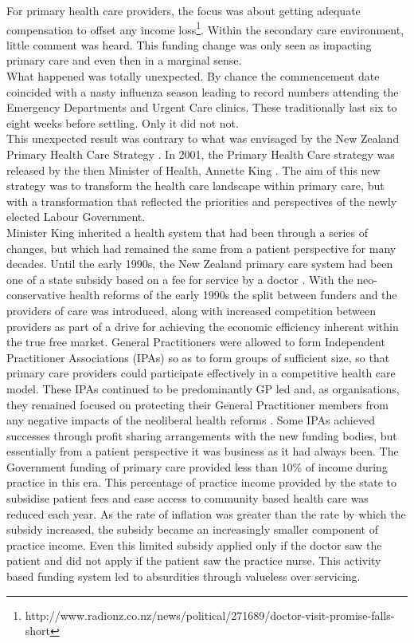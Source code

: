 \documentclass[11pt,a4paper]{article}
\begin{document}
For primary health care providers, the focus was about getting adequate compensation to offset any income loss\footnote{http://www.radionz.co.nz/news/political/271689/doctor-visit-promise-falls-short}. Within the secondary care environment, little comment was heard. This funding change was only seen as impacting primary care and even then in a marginal sense.\\

What happened was totally unexpected. By chance the commencement date coincided with a nasty influenza season leading to record numbers attending the Emergency Departments and Urgent Care clinics. These traditionally last six to eight weeks before settling. Only it did not not.\\

This unexpected result was contrary to what was envisaged by the  New Zealand Primary Health Care Strategy \citep{king2001primary}. In 2001, the Primary Health Care strategy was released by the then Minister of Health, Annette King \citep{king2001primary}. The aim of this new strategy was to transform the health care landscape within primary care, but with a transformation that reflected the priorities and perspectives of the newly elected Labour Government.\\

Minister King inherited a health system that had been through a series of changes, but which had remained the same from a patient perspective for many decades. Until the early 1990s, the New Zealand primary care system had been one of a state subsidy based on a fee for service by a doctor \citep{gauld2006new}. With the neo-conservative health reforms of the early 1990s the split between funders and the providers of care was introduced, along with increased competition between providers as part of a drive for achieving the economic efficiency inherent within the true free market. General Practitioners were allowed to form Independent Practitioner Associations (IPAs) so as to form groups of sufficient size, so that primary care providers could participate effectively in a competitive health care model. These IPAs continued to be predominantly GP led and, as organisations, they remained focused on protecting their General Practitioner members from any negative impacts of the neoliberal health reforms \citep{malcolm1999new}. Some IPAs achieved successes through profit sharing arrangements with the new funding bodies, but essentially from a patient perspective it was business as it had always been. The Government funding of primary care provided less than 10\% of income during practice in this era. This percentage of practice income provided by the state to subsidise patient fees and ease access to community based health care was reduced each year. As the rate of inflation was greater than the rate by which the subsidy increased, the subsidy became an increasingly smaller component of practice income. Even this limited subsidy applied only if the doctor saw the patient and did not apply if the patient saw the practice nurse. This activity based funding system led to absurdities through valueless over servicing. \\    
\end{document}
